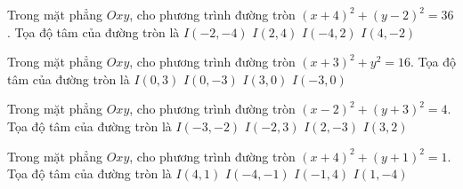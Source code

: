 \begin{ex}
Trong mặt phẳng $Oxy$, cho phương trình đường tròn $(x + 4)^2  + (y -2)^2 = 36$. Tọa độ tâm của đường tròn là
\choice
{ $I(-2, -4)$ }
{ $I(2, 4)$ }
{ \True $I(-4, 2)$ }
{ $I(4, -2)$ }
\end{ex}

\begin{ex}
Trong mặt phẳng $Oxy$, cho phương trình đường tròn $(x + 3)^2  + y^2 = 16$. Tọa độ tâm của đường tròn là
\choice
{ $I(0, 3)$ }
{ $I(0, -3)$ }
{ $I(3, 0)$ }
{ \True $I(-3, 0)$ }
\end{ex}

\begin{ex}
Trong mặt phẳng $Oxy$, cho phương trình đường tròn $(x -2)^2   + (y + 3)^2 = 4$. Tọa độ tâm của đường tròn là
\choice
{ $I(-3, -2)$ }
{ $I(-2, 3)$ }
{ \True $I(2, -3)$ }
{ $I(3, 2)$ }
\end{ex}

\begin{ex}
Trong mặt phẳng $Oxy$, cho phương trình đường tròn $(x + 4)^2  + (y + 1)^2 = 1$. Tọa độ tâm của đường tròn là
\choice
{ $I(4, 1)$ }
{ \True $I(-4, -1)$ }
{ $I(-1, 4)$ }
{ $I(1, -4)$ }
\end{ex}


